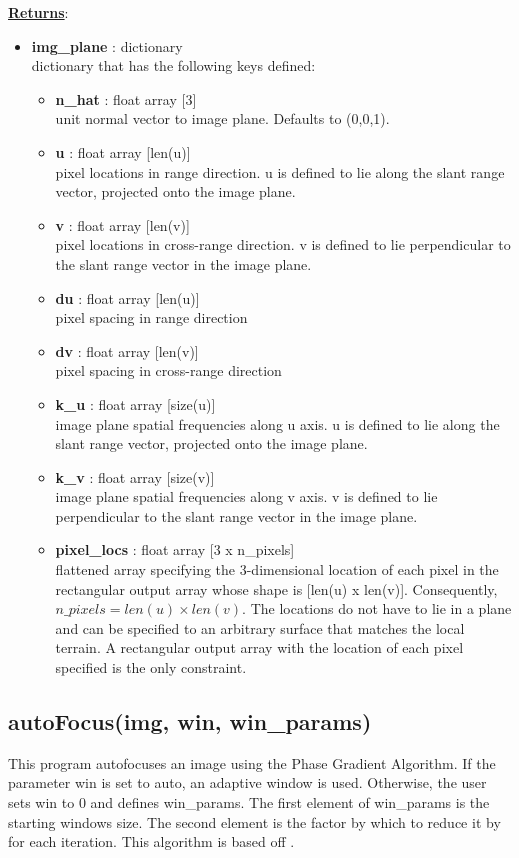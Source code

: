 \documentclass{article}
\newcommand{\defs}[2]{\textbf{{#1}} : {#2}}
\begin{document}
\noindent \underline{\textbf{Returns}}:
\begin{itemize}
	  	\item \defs{img\_plane}{dictionary}\\
	  	dictionary that has the following keys defined:
		\begin{itemize}
			\item\defs{n\_hat}{float array [3]}\\
				unit normal vector to image plane.  Defaults to (0,0,1).
			\item \defs{u}{float array [len(u)]}\\
		    	pixel locations in range direction.  u is defined to lie along the slant range vector, projected onto the image plane.
			\item \defs{v}{float array [len(v)]}\\
		    	pixel locations in cross-range direction.  v is defined to lie perpendicular to the slant range vector in the image plane.
			\item \defs{du}{float array [len(u)]}\\
		    	pixel spacing in range direction
			\item \defs{dv}{float array [len(v)]}\\
		    	pixel spacing in cross-range direction
		    \item \defs{k\_u}{float array [size(u)]}\\
		    	image plane spatial frequencies along u axis.  u is defined to lie along the slant range vector, projected onto the image plane.
		    \item \defs{k\_v}{float array [size(v)]}\\
		    	image plane spatial frequencies along v axis.  v is defined to lie perpendicular to the slant range vector in the image plane.
		    \item \defs{pixel\_locs}{float array [3 x n\_pixels]}\\
		    	flattened array specifying the 3-dimensional location of each pixel in the rectangular output array whose shape is [len(u) x len(v)].  Consequently, $n\_pixels = len(u) \times len(v)$.  The locations do not have to lie in a plane and can be specified to an arbitrary surface that matches the local terrain.  A rectangular output array with the location of each pixel specified is the only constraint.
		\end{itemize}
\end{itemize}

\subsection{autoFocus(img, win, win\_params)}
This program autofocuses an image using the Phase Gradient Algorithm.  If the parameter win is set to auto, an adaptive window is used.  Otherwise, the user sets win to 0 and defines win\_params.  The first element of win\_params is the starting windows size.  The second element is the factor by which to reduce it by for each iteration.  This algorithm is based off \cite{303752}.\\
\end{document}
